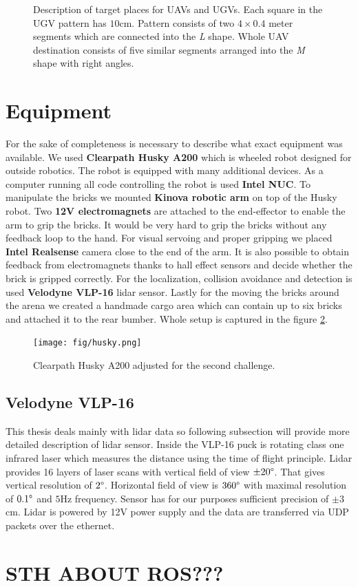 \begin{figure}[H]
\caption[Brick destinations]{Description of target places for UAVs and UGVs. Each square in the UGV pattern has $10$cm. Pattern consists of two $4\times0.4$ meter segments which are connected into the \textit{L} shape. Whole UAV destination consists of five similar segments arranged into the \textit{M} shape with right angles.}
\label{fig:dest}
\end{figure}


\section{Equipment}
For the sake of completeness is necessary to describe what exact equipment was available. We used \textbf{Clearpath Husky A200} which is wheeled robot designed for outside robotics. The robot is equipped with many additional devices. As a computer running all code controlling the robot is used \textbf{Intel NUC}. To manipulate the bricks we mounted \textbf{Kinova robotic arm} on top of the Husky robot. Two \textbf{12V electromagnets} are attached to the end-effector to enable the arm to grip the bricks. It would be very hard to grip the bricks without any feedback loop to the hand. For visual servoing and proper gripping we placed \textbf{Intel Realsense} camera close to the end of the arm. It is also possible to obtain feedback from electromagnets thanks to hall effect sensors and decide whether the brick is gripped correctly. For the localization, collision avoidance and detection is used \textbf{Velodyne VLP-16} lidar sensor. Lastly for the moving the bricks around the arena we created a handmade cargo area which can contain up to six bricks and attached it to the rear bumber. Whole setup is captured in the figure \ref{fig:husky}.

\begin{figure}[H]
\centering
\texttt{[image: fig/husky.png]}
\caption[UGV robot setup]{Clearpath Husky A200 adjusted for the second challenge.}
\label{fig:husky}

\end{figure}

\subsection{Velodyne VLP-16}
This thesis deals mainly with lidar data so following subsection will provide more detailed description of lidar sensor. Inside the VLP-16 puck is rotating class one infrared laser which measures the distance using the time of flight principle. Lidar provides 16 layers of laser scans with vertical field of view $\pm 20 \degree$. That gives vertical resolution of $2 \degree$. Horizontal field of view is $360 \degree$ with maximal resolution of $0.1 \degree$ and $5$Hz frequency. Sensor has for our purposes sufficient precision of $\pm 3$cm. Lidar is powered by 12V power supply and the data are transferred via UDP packets over the ethernet.


\section{STH ABOUT ROS???}